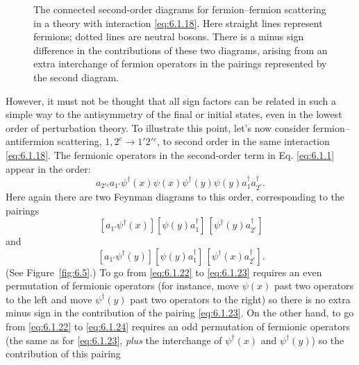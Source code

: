 \begingroup
\renewcommand{\thefigure}{6.\arabic{figure}}
\setcounter{figure}{3}
\begin{figure}[htbp]

\caption{The connected second-order diagrams for fermion--fermion scattering
in a theory with interaction \eqref{eq:6.1.18}. Here straight lines represent
fermions; dotted lines are neutral bosons. There is a minus sign difference in
the contributions of these two diagrams, arising from an extra interchange of
fermion operators in the pairings represented by the second diagram.}
\label{fig:6.4}
\end{figure}
\endgroup

However, it must not be thought that all sign factors can be related in such a
simple way to the antisymmetry of the final or initial states, even in the
lowest order of perturbation theory. To illustrate this point, let's now
consider fermion--antifermion scattering, $1,2^c\to1'2'{}^c$, to second order
in the same interaction \eqref{eq:6.1.18}. The fermionic operators in the second-order
term in Eq. \eqref{eq:6.1.1} appear in the order:
\begin{equation}
a_{2'{}^c}a_{1'}\psi^\dagger(x)\psi(x)\psi^\dagger(y)\psi(y)
 a^\dagger_{1}a^\dagger_{2^c}.
\tag{6.1.22}
\label{eq:6.1.22}
\end{equation}
Here again there are two Feynman diagrams to this order, corresponding to the
pairings
\begin{equation}
[a_{2'{}^c}\psi(x)]\,[a_{1'}\psi^\dagger(x)]
 [\psi(y)a^\dagger_{1}]\,[\psi^\dagger(y)a^\dagger_{2^c}]
\tag{6.1.23}
\label{eq:6.1.23}
\end{equation}
and
\begin{equation}
[a_{2'{}^c}\psi(x)]\,[a_{1'}\psi^\dagger(y)]
 [\psi(y)a^\dagger_{1}]\,[\psi^\dagger(x)a^\dagger_{2^c}].
\tag{6.1.24}
\label{eq:6.1.24}
\end{equation}
(See Figure~\ref{fig:6.5}.) To go from \eqref{eq:6.1.22} to \eqref{eq:6.1.23} requires an even permutation
of fermionic operators (for instance, move $\psi(x)$ past two operators to the
left and move $\psi^\dagger(y)$ past two operators to the right) so there is no
extra minus sign in the contribution of the pairing \eqref{eq:6.1.23}. On the other
hand, to go from \eqref{eq:6.1.22} to \eqref{eq:6.1.24} requires an odd permutation of fermionic
operators (the same as for \eqref{eq:6.1.23}, \emph{plus} the interchange of
$\psi^\dagger(x)$ and $\psi^\dagger(y)$) so the contribution of this pairing
